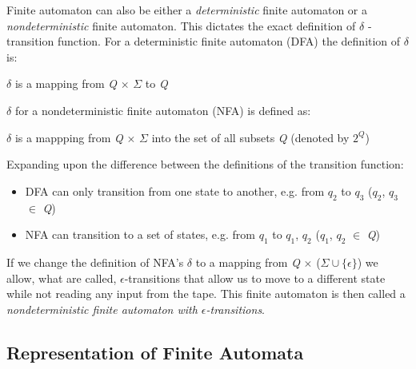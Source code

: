 Finite automaton can also be either a \textit{deterministic} finite automaton or a \textit{nondeterministic} finite automaton. This dictates the exact definition of $\delta$ - transition function.
For a deterministic finite automaton (DFA) the definition of $\delta$ is:\\
\centerline{$\delta$ is a mapping from \textit{Q} $\times$ $\Sigma$ to \textit{Q}}
$\delta$ for a nondeterministic finite automaton (NFA) is defined as:\\
\centerline{$\delta$ is a mappping from \textit{Q} $\times$ $\Sigma$ into the set of all subsets \textit{Q} (denoted by $2^\textit{Q}$)}
Expanding upon the difference between the definitions of the transition function:
\begin{itemize}
    \item DFA can only transition from one state to another, e.g. from $\textit{q}_2$ to $\textit{q}_3$ ($\textit{q}_2$, $\textit{q}_3$ $\in$ \textit{Q})
    \item NFA can transition to a set of states, e.g. from $\textit{q}_1$ to $\textit{q}_1$, $\textit{q}_2$ ($\textit{q}_1$, $\textit{q}_2$ $\in$ \textit{Q})
\end{itemize}
If we change the definition of NFA's $\delta$ to a mapping from \textit{Q} $\times$ ($\Sigma \cup \{\epsilon\}$) we allow, what are called, $\epsilon$-transitions that allow us to move to a different state while not reading any input from the tape. This finite automaton is then called a \textit{nondeterministic finite automaton with $\epsilon$-transitions}.

\subsection{Representation of Finite Automata}

